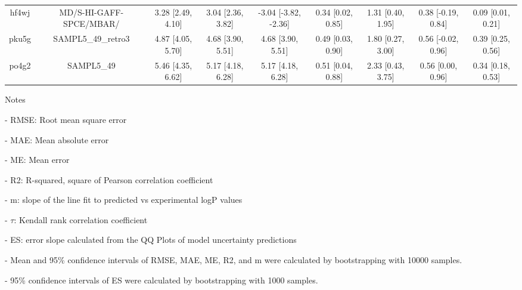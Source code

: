 \documentclass{article}
\begin{document}
\begin{center}
\begin{longtable}{|ccccccccc|}
 hf4wj &                            MD/S-HI-GAFF-SPCE/MBAR/ &  3.28 [2.49, 4.10] &  3.04 [2.36, 3.82] &  -3.04 [-3.82, -2.36] &  0.34 [0.02, 0.85] &    1.31 [0.40, 1.95] &   0.38 [-0.19, 0.84] &     0.09 [0.01, 0.21] \\
 pku5g &                                 SAMPL5\_49\_retro3 &  4.87 [4.05, 5.70] &  4.68 [3.90, 5.51] &     4.68 [3.90, 5.51] &  0.49 [0.03, 0.90] &    1.80 [0.27, 3.00] &   0.56 [-0.02, 0.96] &     0.39 [0.25, 0.56] \\
 po4g2 &                                         SAMPL5\_49 &  5.46 [4.35, 6.62] &  5.17 [4.18, 6.28] &     5.17 [4.18, 6.28] &  0.51 [0.04, 0.88] &    2.33 [0.43, 3.75] &    0.56 [0.00, 0.96] &     0.34 [0.18, 0.53] \\
\end{longtable}
\end{center}

Notes

- RMSE: Root mean square error

- MAE: Mean absolute error

- ME: Mean error

- R2: R-squared, square of Pearson correlation coefficient

- m: slope of the line fit to predicted vs experimental logP values

- $\tau$:  Kendall rank correlation coefficient

- ES: error slope calculated from the QQ Plots of model uncertainty predictions

- Mean and 95\% confidence intervals of RMSE, MAE, ME, R2, and m were calculated by bootstrapping with 10000 samples.

- 95\% confidence intervals of ES were calculated by bootstrapping with 1000 samples.\end{document}
\end{document}
